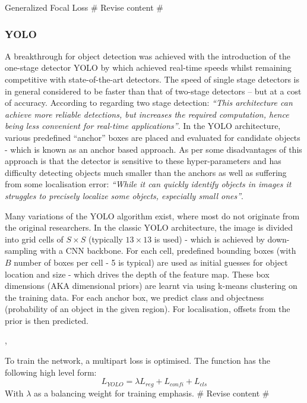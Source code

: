 \documentclass[a4paper,twoside,12pt]{report}
\begin{document}
Generalized Focal Loss \citep{focalloss}  \# Revise content \#

\subsubsection{YOLO}

A breakthrough for object detection was achieved with the introduction of the one-stage detector YOLO by \cite{yolo} which achieved real-time speeds whilst remaining competitive with state-of-the-art detectors. The speed of single stage detectors is in general considered to be faster than that of two-stage detectors -- but at a cost of accuracy. According to \cite{stagecomp} regarding two stage detection: \textit{``This architecture can achieve more reliable detections, but increases the required computation, hence being less convenient for real-time applications''}. In the YOLO architecture, various predefined ``anchor'' boxes are placed and evaluated for candidate objects - which is known as an anchor based approach. As per \cite{yolo} some disadvantages of this approach is that the detector is sensitive to these hyper-parameters and has difficulty detecting objects much smaller than the anchors as well as suffering from some localisation error: \textit{``While it can quickly identify objects in images it struggles to precisely localize some objects, especially small ones''}.

Many variations of the YOLO algorithm exist, where most do not originate from the original researchers. In the classic YOLO architecture, the image is divided into grid cells of $S\times S$ (typically $13\times 13$ is used) - which is achieved by down-sampling with a CNN backbone. For each cell, predefined bounding boxes (with $B$ number of boxes per cell - 5 is typical) are used as initial guesses for object location and size - which drives the depth of the feature map. These box dimensions (AKA dimensional priors) are learnt via using k-means clustering on the training data. For each anchor box, we predict class and objectness (probability of an object in the given region). For localisation, offsets from the prior is then predicted. \citep{comprehensive}

\cite{yolocomprehensive}, \citep{yolov4}

To train the network, a multipart loss is optimised. The function has the following high level form:
\begin{equation}
L_{YOLO} =  \lambda L_{reg} + L_{confi} + L_{cls} 
\end{equation} 
With $\lambda$ as a balancing weight for training emphasis.  \# Revise content \# 
\end{document}

